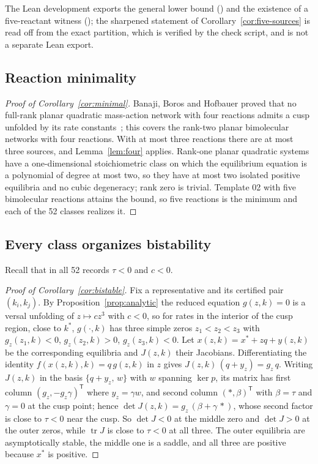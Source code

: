 \documentclass[11pt,a4paper]{article}
\theoremstyle{plain}
\theoremstyle{definition}
\theoremstyle{remark}
\numberwithin{equation}{section}
\newcommand{\T}{\mathsf{T}}
\newcommand{\tr}{\operatorname{tr}}
\newcommand{\Ker}{\operatorname{ker}}
\begin{document}
The Lean development exports the general lower bound () and the existence of a five-reactant witness (); the sharpened statement of Corollary~\ref{cor:five-sources} is read off from the exact partition, which is verified by the check script, and is not a separate Lean export.

\subsection{Reaction minimality}
\begin{proof}[Proof of Corollary~\ref{cor:minimal}]
Banaji, Boros and Hofbauer proved that no full-rank planar quadratic mass-action network with four reactions admits a cusp unfolded by its rate constants~\citep[Theorem~36]{BBH2024}; this covers the rank-two planar bimolecular networks with four reactions. With at most three reactions there are at most three sources, and Lemma~\ref{lem:four} applies. Rank-one planar quadratic systems have a one-dimensional stoichiometric class on which the equilibrium equation is a polynomial of degree at most two, so they have at most two isolated positive equilibria and no cubic degeneracy; rank zero is trivial. Template 02 with five bimolecular reactions attains the bound, so five reactions is the minimum and each of the 52 classes realizes it.
\end{proof}

\subsection{Every class organizes bistability}
Recall that in all 52 records $\tau<0$ and $c<0$.

\begin{proof}[Proof of Corollary~\ref{cor:bistable}]
Fix a representative and its certified pair $(k_i,k_j)$. By Proposition~\ref{prop:analytic} the reduced equation $g(z,k)=0$ is a versal unfolding of $z\mapsto cz^3$ with $c<0$, so for rates in the interior of the cusp region, close to $k^*$, $g(\cdot,k)$ has three simple zeros $z_1<z_2<z_3$ with $g_z(z_1,k)<0$, $g_z(z_2,k)>0$, $g_z(z_3,k)<0$. Let $x(z,k)=x^*+zq+y(z,k)$ be the corresponding equilibria and $J(z,k)$ their Jacobians. Differentiating the identity $f(x(z,k),k)=q\,g(z,k)$ in $z$ gives $J(z,k)\,(q+y_z)=g_z\,q$. Writing $J(z,k)$ in the basis $\{q+y_z,\,w\}$ with $w$ spanning $\Ker p$, its matrix has first column $(g_z,-g_z\gamma)^{\T}$ where $y_z=\gamma w$, and second column $(\ast,\beta)^{\T}$ with $\beta=\tau$ and $\gamma=0$ at the cusp point; hence $\det J(z,k)=g_z\,(\beta+\gamma\,\ast)$, whose second factor is close to $\tau<0$ near the cusp. So $\det J<0$ at the middle zero and $\det J>0$ at the outer zeros, while $\tr J$ is close to $\tau<0$ at all three. The outer equilibria are asymptotically stable, the middle one is a saddle, and all three are positive because $x^*$ is positive.
\end{proof}
\end{document}
